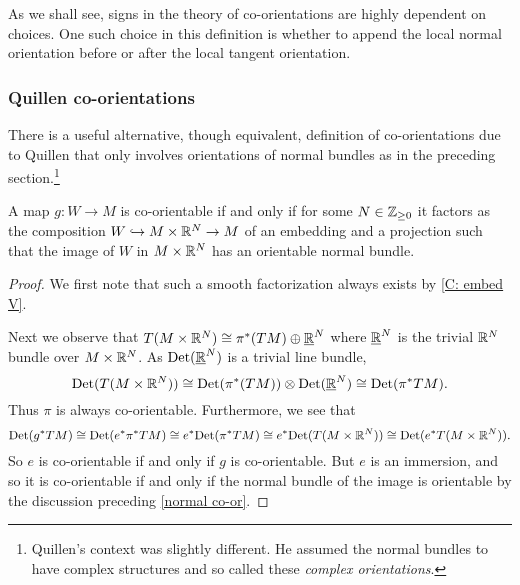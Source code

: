 As we shall see, signs in the theory of co-orientations are highly dependent on choices.
One such choice in this definition is whether to append the local normal orientation before or after the local tangent orientation.

\subsubsection{Quillen co-orientations}\label{S: Quillen}

There is a useful alternative, though equivalent, definition of co-orientations due to Quillen \cite{Quil71} that only involves orientations of normal bundles as in the preceding section.\footnote{Quillen's context was slightly different.
He assumed the normal bundles to have complex structures and so called these \textit{complex orientations}.}

\begin{lemma}\label{L: Quillen}
	A map $g \colon W \to M$ is co-orientable if and only if for some $N \in \mathbb{Z}_{\geq 0}$ it factors as the composition $W \hookrightarrow M \times \mathbb{R}^N \to M$ of an embedding and a projection such that the image of $W$ in $M \times \mathbb{R}^N$ has an orientable normal bundle.
\end{lemma}

\begin{proof}
	We first note that such a smooth factorization always exists by \cref{C: embed V}.

	Next we observe that $T(M \times \mathbb{R}^N) \cong \pi^*(TM) \oplus \underline{\mathbb{R}}^N$ where $\underline{\mathbb{R}}^N$ is the trivial $\mathbb{R}^N$ bundle over $M \times \mathbb{R}^N$.
	As ${\rm Det}( \underline{\mathbb{R}}^N)$ is a trivial line bundle,
	\begin{equation*}
		{\rm Det}(T(M \times \mathbb{R}^N)) \cong {\rm Det}(\pi^*(TM)) \otimes {\rm Det}(\underline{\mathbb{R}}^N) \cong {\rm Det}(\pi^*TM).
	\end{equation*}
	Thus $\pi$ is always co-orientable.
	Furthermore, we see that
	\begin{equation*}
		{\rm Det}(g^*TM) \cong {\rm Det}(e^*\pi^*TM) \cong e^*{\rm Det}(\pi^*TM) \cong e^*{\rm Det}(T(M \times \mathbb{R}^N)) \cong {\rm Det}(e^*T(M \times \mathbb{R}^N)).
	\end{equation*}
	So $e$ is co-orientable if and only if $g$ is co-orientable.
	But $e$ is an immersion, and so it is co-orientable if and only if the normal bundle of the image is orientable by the discussion preceding \cref{normal co-or}.
\end{proof}

